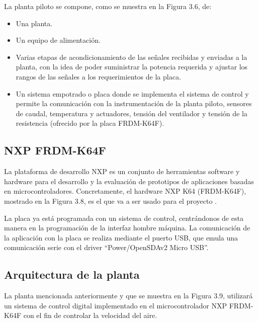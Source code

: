 La planta piloto se compone, como se muestra en la Figura 3.6, de:
\begin{itemize}
	\item Una planta.
	\item Un equipo de alimentación.
	\item Varias etapas de acondicionamiento de las señales recibidas y enviadas a la planta, con la idea de poder suministrar la potencia requerida y ajustar los rangos de las señales a los requerimientos de la placa.
	\item Un sistema empotrado o placa donde se implementa el sistema de control y permite la comunicación con la instrumentación de la planta piloto, sensores de caudal, temperatura y actuadores, tensión del ventilador y tensión de la resistencia (ofrecido por la placa FRDM-K64F).
\end{itemize} 


\subsection{NXP FRDM-K64F}

La plataforma de desarrollo NXP es un conjunto de herramientas software y hardware para el desarrollo y la evaluación de prototipos de aplicaciones basadas en microcontroladores. Concretamente, el hardware NXP K64 (FRDM-K64F), mostrado en la Figura 3.8, es el que va a ser usado para el proyecto \cite{08frdmk64f_manual}.


La placa ya está programada con un sistema de control, centrándonos de esta manera en la programación de la interfaz hombre máquina. La comunicación de la aplicación con la placa se realiza mediante el puerto USB, que emula una comunicación serie con el driver ``Power/OpenSDAv2 Micro USB''.

\subsection{Arquitectura de la planta}

La planta mencionada anteriormente y que se muestra en la Figura 3.9, utilizará un sistema de control digital implementado en el microcontrolador NXP FRDM-K64F con el fin de controlar la velocidad del aire.


